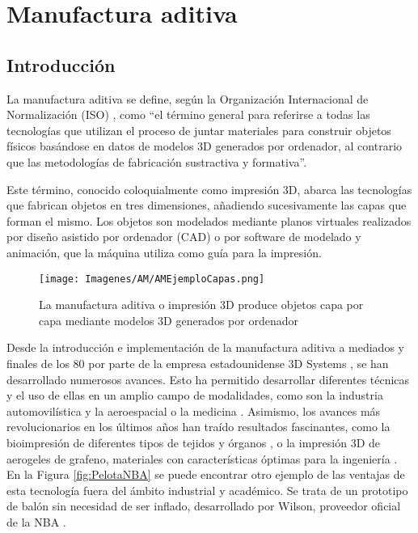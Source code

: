 \documentclass{report}
\begin{document}
\chapter{Manufactura aditiva}\label{ManufAditiv}

\section{Introducción}

La manufactura aditiva se define, según la Organización Internacional de Normalización (ISO) \cite{AMISOdefinicion}, como ``el término general para referirse a todas las tecnologías que utilizan el proceso de juntar materiales para construir objetos físicos basándose en datos de modelos 3D generados por ordenador, al contrario que las metodologías de fabricación sustractiva y formativa''.

Este término, conocido coloquialmente como impresión 3D, abarca las tecnologías que fabrican objetos en tres dimensiones, añadiendo sucesivamente las capas que forman el mismo. Los objetos son modelados mediante planos virtuales realizados por diseño asistido por ordenador (CAD) o por software de modelado y animación, que la máquina utiliza como guía para la impresión. \cite{AMWikiDefinition} \cite{AMNoWikiDefinition40Industry}


\vspace{0.6cm}
\begin{figure}[hbpt]
    \centering
    \texttt{[image: Imagenes/AM/AMEjemploCapas.png]}
    \caption{La manufactura aditiva o impresión 3D produce objetos capa por capa mediante modelos 3D generados por ordenador}
    \label{fig:Impresion3D}
\end{figure}
\vspace{1.5cm}

\vspace{0.4cm}
Desde la introducción e implementación de la manufactura aditiva a mediados y finales de los 80 por parte de la empresa estadounidense 3D Systems \cite{AMInvention}, se han desarrollado numerosos avances. Esto ha permitido desarrollar diferentes técnicas y el uso de ellas en un amplio campo de modalidades, como son la industria automovilística \cite{AMinAuto} y la aeroespacial \cite{AMinAero} o la medicina \cite{AMinMedicine}. Asimismo, los avances más revolucionarios en los últimos años han traído resultados fascinantes, como la bioimpresión de diferentes tipos de tejidos y órganos \cite{AMInnovativeOrgans}, o la impresión 3D de aerogeles de grafeno, materiales con características óptimas para la ingeniería \cite{AMInnovativeGrafeno}. En la Figura \ref{fig:PelotaNBA} se puede encontrar otro ejemplo de las ventajas de esta tecnología fuera del ámbito industrial y académico. Se trata de un prototipo de balón sin necesidad de ser inflado, desarrollado por Wilson, proveedor oficial de la NBA \cite{AMInnovativeNBA}. 
\end{document}
